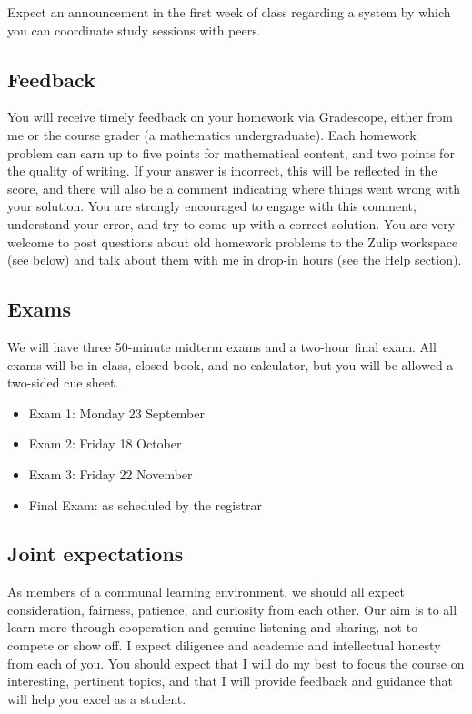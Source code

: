 \documentclass[11pt,twoside]{amsart}
\begin{document}
Expect an announcement in the first week of class regarding a system by which you can coordinate study sessions with peers.


\subsection*{Feedback}
You will receive timely feedback on your homework via Gradescope, either from me or the course grader (a mathematics undergraduate).  Each homework problem can earn up to five points for mathematical content, and two points for the quality of writing.  If your answer is incorrect, this will be reflected in the score, and there will also be a comment indicating where things went wrong with your solution.  You are strongly encouraged to engage with this comment, understand your error, and try to come up with a correct solution.  You are very welcome to post questions about old homework problems to the Zulip workspace (see below) and talk about them with me in drop-in hours (see the Help section).



\subsection*{Exams}
We will have three 50-minute midterm exams and a two-hour final exam. All exams will be in-class, closed book, and no calculator, but you will be allowed a two-sided cue sheet.

\begin{itemize}
\item Exam 1: Monday 23 September
\item Exam 2: Friday 18 October
\item Exam 3: Friday 22 November
\item Final Exam: as scheduled by the registrar
\end{itemize}



\subsection*{Joint expectations}
As members of a communal learning environment, we should all expect consideration, fairness, patience, and curiosity from each other.  Our aim is to all learn more through cooperation and genuine listening and sharing, not to compete or show off.  I expect diligence and academic and intellectual honesty from each of you.  You should expect that I will do my best to focus the course on interesting, pertinent topics, and that I will provide feedback and guidance that will help you excel as a student.
\end{document}
